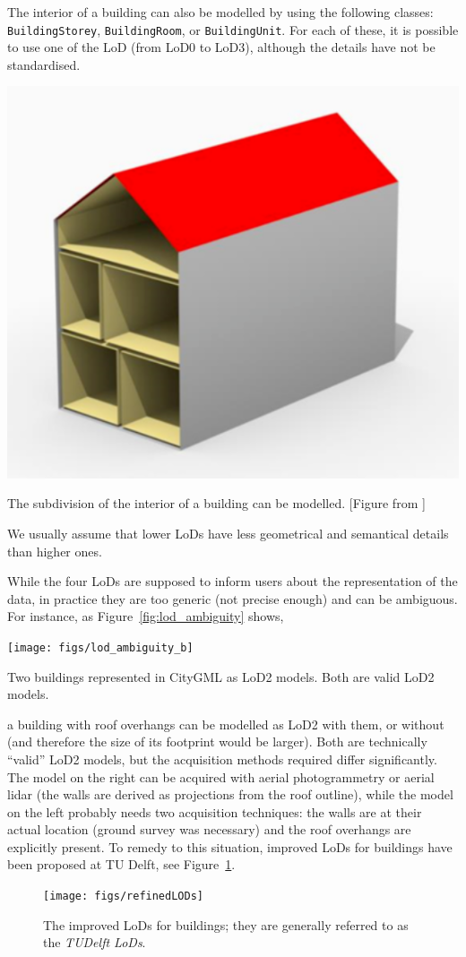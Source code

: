 The interior of a building can also be modelled by using the following classes: \texttt{BuildingStorey}, \texttt{BuildingRoom}, or \texttt{BuildingUnit}.
For each of these, it is possible to use one of the LoD (from LoD0 to LoD3), although the details have not be standardised.
  \begin{marginfigure}
    \centering
    \includegraphics[width=\linewidth]{figs/lod4}
    \caption{The subdivision of the interior of a building can be modelled. [Figure from \citet{Lowner16}]}%
  \label{fig:lod4}
  \end{marginfigure}
We usually assume that lower LoDs have less geometrical and semantical details than higher ones.

%

While the four LoDs are supposed to inform users about the representation of the data, in practice they are too generic (not precise enough) and can be ambiguous. 
For instance, as Figure~\ref{fig:lod_ambiguity} shows,
\begin{marginfigure}
  \centering
  \texttt{[image: figs/lod\_ambiguity\_b]}
  \caption{Two buildings represented in CityGML as LoD2 models. Both are valid LoD2 models.}%
\label{fig:lod_ambiguity}
\end{marginfigure}
a building with roof overhangs can be modelled as LoD2 with them, or without (and therefore the size of its footprint would be larger).
Both are technically ``valid'' LoD2 models, but the acquisition methods required differ significantly.
The model on the right can be acquired with aerial photogrammetry or aerial lidar (the walls are derived as projections from the roof outline), while the model on the left probably needs two acquisition techniques: the walls are at their actual location (ground survey was necessary) and the roof overhangs are explicitly present.
To remedy to this situation, improved LoDs for buildings have been proposed at TU Delft, see Figure~\ref{fig:refinedLODs}.
\begin{figure}
  \centering
  \texttt{[image: figs/refinedLODs]}
  \caption{The improved LoDs for buildings; they are generally referred to as the \emph{TUDelft LoDs}.}%
\label{fig:refinedLODs}
\end{figure}

